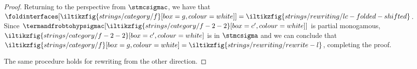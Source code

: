 \begin{proof}
    Returning to the perspective from \(\stmcsigmac\), we have that \(
    \foldinterfaces[
        \iltikzfig{strings/category/f}[box=g,colour=white]
    ]
    =
    \iltikzfig{strings/rewriting/lc-folded-shifted}
    \).
    Since \(
    \termandfrobtohypsigmac[
        \iltikzfig{strings/category/f-2-2}[box=c^\prime, colour=white]
    ]
    \) is partial monogamous, \(
    \iltikzfig{strings/category/f-2-2}[box=c^\prime, colour=white]
    \) is in \(\stmcsigma\) and we can conclude that \(
    \iltikzfig{strings/category/f}[box=g,colour=white]
    =
    \iltikzfig{strings/rewriting/rewrite-l}
    \), completing the proof.

    The same procedure holds for rewriting from the other direction.
\end{proof}